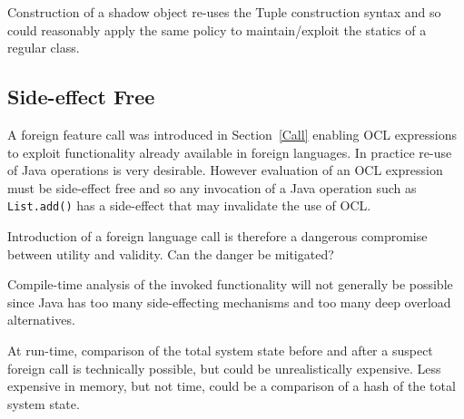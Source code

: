 \documentclass[sigconf]{acmart}
\begin{document}
Construction of a shadow object re-uses the Tuple construction syntax and so could reasonably apply the same policy to maintain/exploit the statics of a regular class.






\subsection{Side-effect Free}\label{Side-effect Free}

A foreign feature call was introduced in Section~\ref{Call} enabling OCL expressions to exploit functionality already available in foreign languages. In practice re-use of Java operations is very desirable. However evaluation of an OCL expression must be side-effect free and so any invocation of a Java operation such as \verb|List.add()| has a side-effect that may invalidate the use of OCL.

Introduction of a foreign language call is therefore a dangerous compromise between utility and validity. Can the danger be mitigated?

Compile-time analysis of the invoked functionality will not generally be possible since Java has too many side-effecting mechanisms and too many deep overload alternatives.

At run-time, comparison of the total system state before and after a suspect foreign call is technically possible, but could be unrealistically expensive. Less expensive in memory, but not time, could be a comparison of a hash of the total system state.
\end{document}
